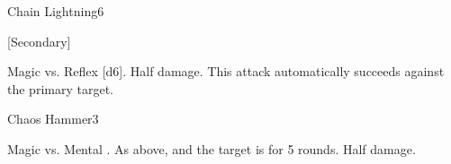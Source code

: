 \begin{spellsection}{Chain Lightning}{6}
    \begin{spellheader}
    \end{spellheader}
    \begin{spellcontent}
        \begin{spelltargetinginfo}
            [Secondary]
        \end{spelltargetinginfo}
        \begin{spelleffects}
            \begin{spellattack}{Magic vs. Reflex}
                \spellsuccess {}[d6].
                \spellfailure Half damage.
                \spellspecial This attack automatically succeeds against the primary target.
            \end{spellattack}
        \end{spelleffects}
    \end{spellcontent}
    \begin{spellfooter}
        \miscastexplode
    \end{spellfooter}
\end{spellsection}

\begin{spellsection}{Chaos Hammer}{3}
    \begin{spellheader}
    \end{spellheader}
    \begin{spellcontent}
        \begin{spelltargetinginfo}
        \end{spelltargetinginfo}
        \begin{spelleffects}
            \begin{spellattack}{Magic vs. Mental}
                \spellsuccess {}.
                \spellcritical As above, and the target is \disoriented for 5 rounds.
                \spellfailure Half damage.
            \end{spellattack}
        \end{spelleffects}
    \end{spellcontent}
    \begin{spellfooter}
        \miscastrandom
    \end{spellfooter}
\end{spellsection}

